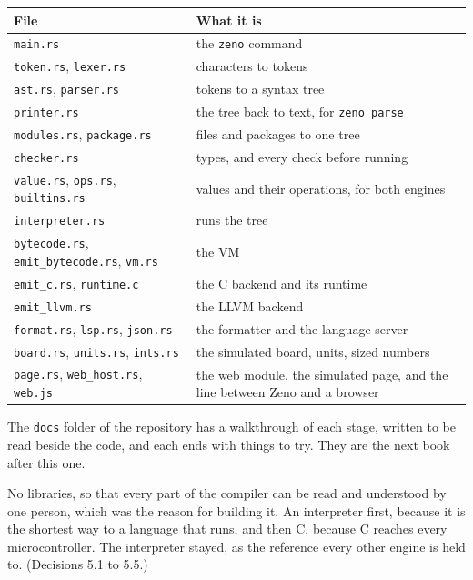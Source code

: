 \begin{center}
\begin{tabular}{lP{8.4cm}}
\toprule
File & What it is \\
\midrule
\verb|main.rs| & the \verb|zeno| command \\
\verb|token.rs|, \verb|lexer.rs| & characters to tokens \\
\verb|ast.rs|, \verb|parser.rs| & tokens to a syntax tree \\
\verb|printer.rs| & the tree back to text, for \verb|zeno parse| \\
\verb|modules.rs|, \verb|package.rs| & files and packages to one tree \\
\verb|checker.rs| & types, and every check before running \\
\verb|value.rs|, \verb|ops.rs|, \verb|builtins.rs| & values and their operations, for both engines \\
\verb|interpreter.rs| & runs the tree \\
\verb|bytecode.rs|, \verb|emit_bytecode.rs|, \verb|vm.rs| & the VM \\
\verb|emit_c.rs|, \verb|runtime.c| & the C backend and its runtime \\
\verb|emit_llvm.rs| & the LLVM backend \\
\verb|format.rs|, \verb|lsp.rs|, \verb|json.rs| & the formatter and the language server \\
\verb|board.rs|, \verb|units.rs|, \verb|ints.rs| & the simulated board, units, sized numbers \\
\verb|page.rs|, \verb|web_host.rs|, \verb|web.js| & the web module, the simulated page, and the line between Zeno and a browser \\
\bottomrule
\end{tabular}
\end{center}

The \verb|docs| folder of the repository has a walkthrough of each
stage, written to be read beside the code, and each ends with things to
try. They are the next book after this one.

\begin{why}
No libraries, so that every part of the compiler can be read and
understood by one person, which was the reason for building it. An
interpreter first, because it is the shortest way to a language that
runs, and then C, because C reaches every microcontroller. The
interpreter stayed, as the reference every other engine is held to.
(Decisions 5.1 to 5.5.)
\end{why}

